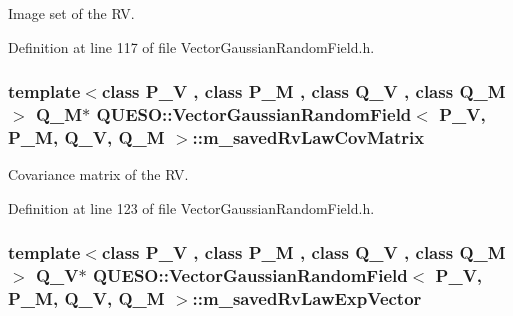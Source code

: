 Image set of the R\-V. 



Definition at line 117 of file Vector\-Gaussian\-Random\-Field.\-h.

\hypertarget{class_q_u_e_s_o_1_1_vector_gaussian_random_field_a0a07c1eec3d56ef764b13586a36921d3}{
\subsubsection[{m\-\_\-saved\-Rv\-Law\-Cov\-Matrix}]{\setlength{\rightskip}{0pt plus 5cm}template$<$class P\-\_\-\-V , class P\-\_\-\-M , class Q\-\_\-\-V , class Q\-\_\-\-M $>$ Q\-\_\-\-M$\ast$ {\bf Q\-U\-E\-S\-O\-::\-Vector\-Gaussian\-Random\-Field}$<$ P\-\_\-\-V, P\-\_\-\-M, Q\-\_\-\-V, Q\-\_\-\-M $>$\-::m\-\_\-saved\-Rv\-Law\-Cov\-Matrix\hspace{0.3cm}{\ttfamily [protected]}}}\label{class_q_u_e_s_o_1_1_vector_gaussian_random_field_a0a07c1eec3d56ef764b13586a36921d3}


Covariance matrix of the R\-V. 



Definition at line 123 of file Vector\-Gaussian\-Random\-Field.\-h.

\hypertarget{class_q_u_e_s_o_1_1_vector_gaussian_random_field_a544ce2c5ff0329b6fb7c625e71eb3576}{
\subsubsection[{m\-\_\-saved\-Rv\-Law\-Exp\-Vector}]{\setlength{\rightskip}{0pt plus 5cm}template$<$class P\-\_\-\-V , class P\-\_\-\-M , class Q\-\_\-\-V , class Q\-\_\-\-M $>$ Q\-\_\-\-V$\ast$ {\bf Q\-U\-E\-S\-O\-::\-Vector\-Gaussian\-Random\-Field}$<$ P\-\_\-\-V, P\-\_\-\-M, Q\-\_\-\-V, Q\-\_\-\-M $>$\-::m\-\_\-saved\-Rv\-Law\-Exp\-Vector\hspace{0.3cm}{\ttfamily [protected]}}}\label{class_q_u_e_s_o_1_1_vector_gaussian_random_field_a544ce2c5ff0329b6fb7c625e71eb3576}


